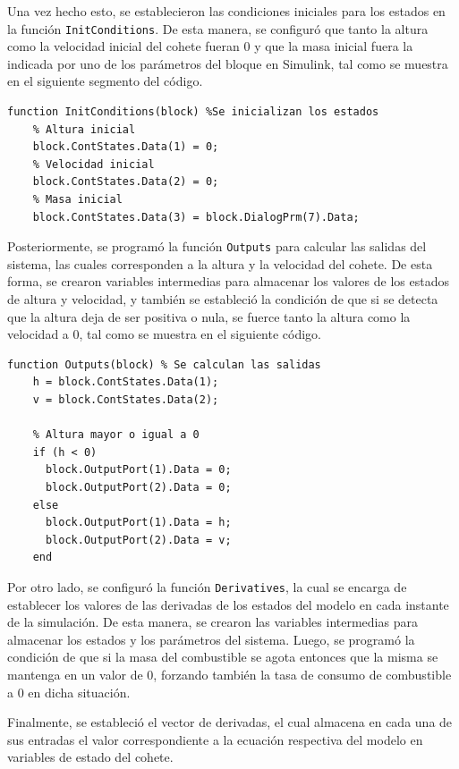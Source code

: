 \documentclass[12pt,letterpaper]{article}
\begin{document}
Una vez hecho esto, se establecieron las condiciones iniciales para los estados en la función
\texttt{InitConditions}. De esta manera, se configuró que tanto la altura como la velocidad inicial
del cohete fueran 0 y que la masa inicial fuera la indicada por uno de los parámetros del bloque en
Simulink, tal como se muestra en el siguiente segmento del código.

\begin{lstlisting}[style=Matlab-editor, basicstyle=\mlttfamily]
  function InitConditions(block) %Se inicializan los estados
    % Altura inicial
    block.ContStates.Data(1) = 0;
    % Velocidad inicial
    block.ContStates.Data(2) = 0;
    % Masa inicial
    block.ContStates.Data(3) = block.DialogPrm(7).Data;
\end{lstlisting}

Posteriormente, se programó la función \texttt{Outputs} para calcular las salidas del sistema, las
cuales corresponden a la altura y la velocidad del cohete. De esta forma, se crearon variables
intermedias para almacenar los valores de los estados de altura y velocidad, y también se estableció la
condición de que si se detecta que la altura deja de ser positiva o nula, se fuerce tanto la altura
como la velocidad a 0, tal como se muestra en el siguiente código.

\begin{lstlisting}[style=Matlab-editor, basicstyle=\mlttfamily]
  function Outputs(block) % Se calculan las salidas
    h = block.ContStates.Data(1);
    v = block.ContStates.Data(2);

    % Altura mayor o igual a 0
    if (h < 0)
      block.OutputPort(1).Data = 0;
      block.OutputPort(2).Data = 0;
    else
      block.OutputPort(1).Data = h;
      block.OutputPort(2).Data = v;
    end
\end{lstlisting}

Por otro lado, se configuró la función \texttt{Derivatives}, la cual se encarga de establecer los
valores de las derivadas de los estados del modelo en cada instante de la simulación. De esta
manera, se crearon las variables intermedias para almacenar los estados y los parámetros
del sistema. Luego, se programó la condición de que si la masa del combustible se agota entonces que
la misma se mantenga en un valor de 0, forzando también la tasa de consumo de combustible a 0 en
dicha situación.

Finalmente, se estableció el vector de derivadas, el cual almacena en cada una de sus entradas el
valor correspondiente a la ecuación respectiva del modelo en variables de estado del cohete.
\end{document}
